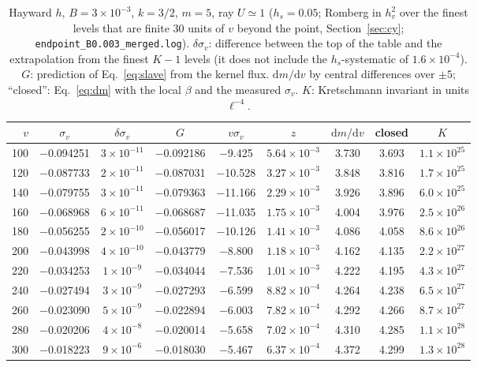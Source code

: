 \documentclass[11pt]{article}
\begin{document}
\begin{table}[ht]\centering\small
\caption{Hayward $h$, $B=3\times10^{-3}$, $k=3/2$, $m=5$, ray $U\simeq1$ ($h_s=0.05$; Romberg in $h_v^{2}$ over the finest levels that are finite $30$ units of $v$ beyond the point, Section~\ref{sec:cy}; \texttt{endpoint\_B0.003\_merged.log}). $\delta\sigma_v$: difference between the top of the table and the extrapolation from the finest $K-1$ levels (it does not include the $h_s$-systematic of $1.6\times10^{-4}$). $G$: prediction of Eq.~\eqref{eq:slave} from the kernel flux. $\mathrm{d}m/\mathrm{d}v$ by central differences over $\pm5$; ``closed'': Eq.~\eqref{eq:dm} with the local $\beta$ and the measured $\sigma_v$. $K$: Kretschmann invariant in units $\ell^{-4}$.}\label{tab:end}
\begin{tabular}{rcccccccc}
\toprule
$v$ & $\sigma_v$ & $\delta\sigma_v$ & $G$ & $v\sigma_v$ & $z$ & $\mathrm{d}m/\mathrm{d}v$ & closed & $K$\\\midrule
100 & $-$0.094251 & $3\!\times\!10^{-11}$ & $-$0.092186 & $-$9.425 & $5.64\!\times\!10^{-3}$ & 3.730 & 3.693 & $1.1\!\times\!10^{25}$\\
120 & $-$0.087733 & $2\!\times\!10^{-11}$ & $-$0.087031 & $-$10.528 & $3.27\!\times\!10^{-3}$ & 3.848 & 3.816 & $1.7\!\times\!10^{25}$\\
140 & $-$0.079755 & $3\!\times\!10^{-11}$ & $-$0.079363 & $-$11.166 & $2.29\!\times\!10^{-3}$ & 3.926 & 3.896 & $6.0\!\times\!10^{25}$\\
160 & $-$0.068968 & $6\!\times\!10^{-11}$ & $-$0.068687 & $-$11.035 & $1.75\!\times\!10^{-3}$ & 4.004 & 3.976 & $2.5\!\times\!10^{26}$\\
180 & $-$0.056255 & $2\!\times\!10^{-10}$ & $-$0.056017 & $-$10.126 & $1.41\!\times\!10^{-3}$ & 4.086 & 4.058 & $8.6\!\times\!10^{26}$\\
200 & $-$0.043998 & $4\!\times\!10^{-10}$ & $-$0.043779 & $-$8.800 & $1.18\!\times\!10^{-3}$ & 4.162 & 4.135 & $2.2\!\times\!10^{27}$\\
220 & $-$0.034253 & $1\!\times\!10^{-9}$ & $-$0.034044 & $-$7.536 & $1.01\!\times\!10^{-3}$ & 4.222 & 4.195 & $4.3\!\times\!10^{27}$\\
240 & $-$0.027494 & $3\!\times\!10^{-9}$ & $-$0.027293 & $-$6.599 & $8.82\!\times\!10^{-4}$ & 4.264 & 4.238 & $6.5\!\times\!10^{27}$\\
260 & $-$0.023090 & $5\!\times\!10^{-9}$ & $-$0.022894 & $-$6.003 & $7.82\!\times\!10^{-4}$ & 4.292 & 4.266 & $8.7\!\times\!10^{27}$\\
280 & $-$0.020206 & $4\!\times\!10^{-8}$ & $-$0.020014 & $-$5.658 & $7.02\!\times\!10^{-4}$ & 4.310 & 4.285 & $1.1\!\times\!10^{28}$\\
300 & $-$0.018223 & $9\!\times\!10^{-6}$ & $-$0.018030 & $-$5.467 & $6.37\!\times\!10^{-4}$ & 4.372 & 4.299 & $1.3\!\times\!10^{28}$\\
\bottomrule
\end{tabular}
\end{table}
\end{document}
